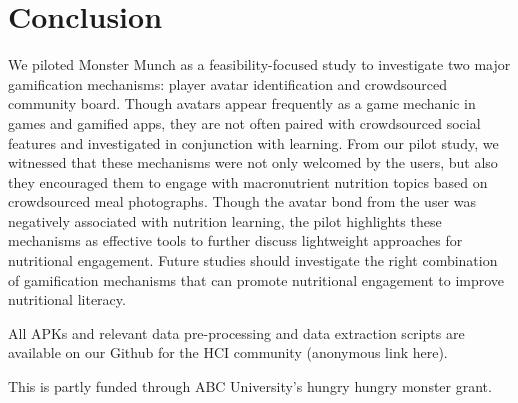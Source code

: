 \vspace{-5pt}
\section{Conclusion}
We piloted Monster Munch as a feasibility-focused study to investigate two major gamification mechanisms: player avatar identification and crowdsourced community board. Though avatars appear frequently as a game mechanic in games and gamified apps, they are not often paired with crowdsourced social features and investigated in conjunction with learning. From our pilot study, we witnessed that these mechanisms were not only welcomed by the users, but also they encouraged them to engage with macronutrient nutrition topics based on crowdsourced meal photographs. Though the avatar bond from the user was negatively associated with nutrition learning, the pilot highlights these mechanisms as effective tools to further discuss lightweight approaches for nutritional engagement. Future studies should investigate the right combination of gamification mechanisms that can promote nutritional engagement to improve nutritional literacy.

All APKs and relevant data pre-processing and data extraction scripts are available on our Github for the HCI community (anonymous link here). 

\begin{acks}
This is partly funded through ABC University's hungry hungry monster grant.
\end{acks}
